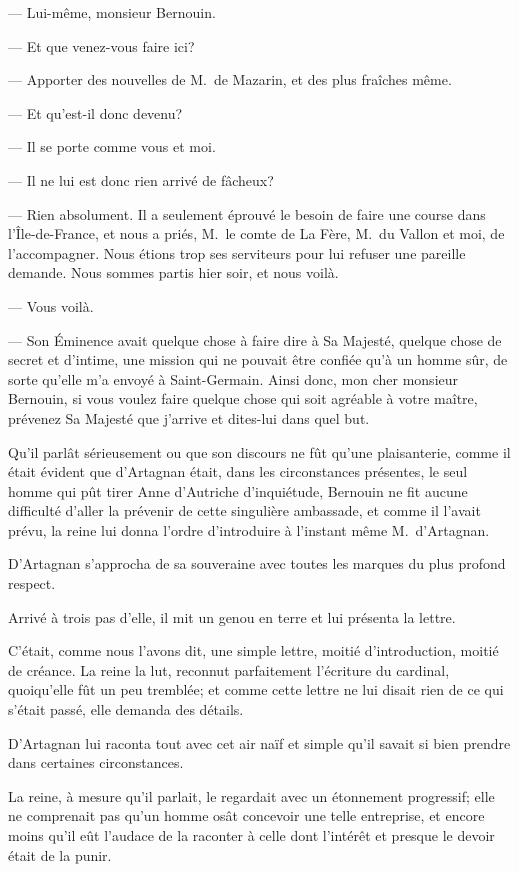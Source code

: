 — Lui-même, monsieur Bernouin.

— Et que venez-vous faire ici?

— Apporter des nouvelles de M.~de Mazarin, et des plus fraîches même.

— Et qu'est-il donc devenu?

— Il se porte comme vous et moi.

— Il ne lui est donc rien arrivé de fâcheux?

— Rien absolument. Il a seulement éprouvé le besoin de faire une course dans l'Île-de-France, et nous a priés, M.~le comte de La Fère, M.~du Vallon et moi, de l'accompagner. Nous étions trop ses serviteurs pour lui refuser une pareille demande. Nous sommes partis hier soir, et nous voilà.

— Vous voilà.

— Son Éminence avait quelque chose à faire dire à Sa Majesté, quelque chose de secret et d'intime, une mission qui ne pouvait être confiée qu'à un homme sûr, de sorte qu'elle m'a envoyé à Saint-Germain. Ainsi donc, mon cher monsieur Bernouin, si vous voulez faire quelque chose qui soit agréable à votre maître, prévenez Sa Majesté que j'arrive et dites-lui dans quel but.

Qu'il parlât sérieusement ou que son discours ne fût qu'une plaisanterie, comme il était évident que d'Artagnan était, dans les circonstances présentes, le seul homme qui pût tirer Anne d'Autriche d'inquiétude, Bernouin ne fit aucune difficulté d'aller la prévenir de cette singulière ambassade, et comme il l'avait prévu, la reine lui donna l'ordre d'introduire à l'instant même M.~d'Artagnan.

D'Artagnan s'approcha de sa souveraine avec toutes les marques du plus profond respect.

Arrivé à trois pas d'elle, il mit un genou en terre et lui présenta la lettre.

C'était, comme nous l'avons dit, une simple lettre, moitié d'introduction, moitié de créance. La reine la lut, reconnut parfaitement l'écriture du cardinal, quoiqu'elle fût un peu tremblée; et comme cette lettre ne lui disait rien de ce qui s'était passé, elle demanda des détails.

D'Artagnan lui raconta tout avec cet air naïf et simple qu'il savait si bien prendre dans certaines circonstances.

La reine, à mesure qu'il parlait, le regardait avec un étonnement progressif; elle ne comprenait pas qu'un homme osât concevoir une telle entreprise, et encore moins qu'il eût l'audace de la raconter à celle dont l'intérêt et presque le devoir était de la punir.

